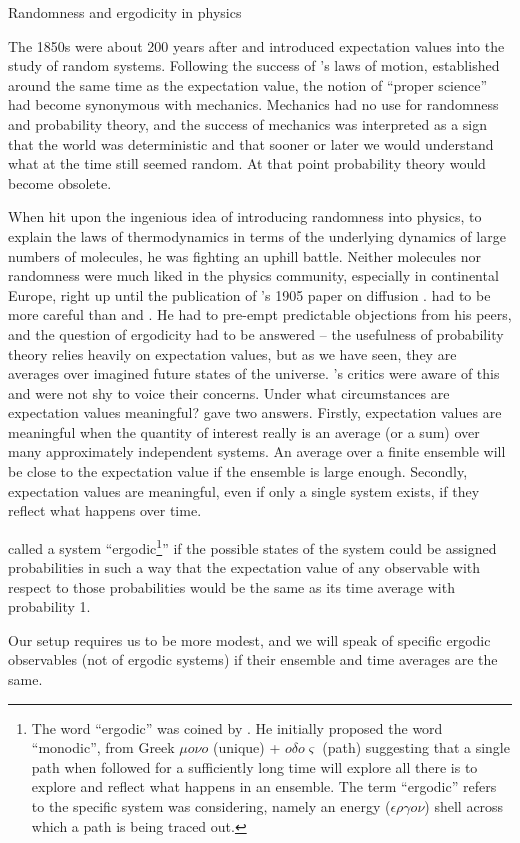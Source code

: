 \begin{history}{Randomness and ergodicity in physics}

The 1850s were about 200 years after  and  introduced expectation 
values into the study of random systems. Following the success of 's 
laws of motion, established around the same time as the expectation value, 
the notion of ``proper science'' had become synonymous with 
mechanics. Mechanics had no use for randomness and probability 
theory, and the success of mechanics was interpreted as a sign that 
the world was deterministic and that sooner or later we would understand 
what at the time still seemed random. At that point probability theory would 
become obsolete. 

When  hit upon the ingenious idea of introducing randomness into 
physics, to explain the laws of thermodynamics in terms of the underlying 
dynamics of large numbers of molecules, he was fighting an uphill battle. 
Neither molecules nor randomness were much liked in the physics 
community, especially in continental Europe, right up until the publication of 
's 1905 paper on diffusion \cite{Einstein1905}.  had to be 
more careful than  and . He had to pre-empt
predictable objections from his peers, and the question of ergodicity had to be 
answered -- the usefulness of probability theory relies heavily on expectation 
values, but as we have seen, they are averages over imagined future states of the 
universe. 's critics were aware of this and were not shy to voice their
concerns. Under what circumstances are expectation values meaningful? 
 gave two answers. Firstly, expectation values are meaningful when 
the quantity of interest really is an average (or a sum) over many approximately 
independent systems. An average over a finite ensemble will be close to the 
expectation value if the ensemble is large enough. Secondly, expectation values 
are meaningful, even if only a single system exists, if they reflect what happens over time. 

 called a system ``ergodic\footnote{The word ``ergodic'' was coined by . 
He initially proposed the word ``monodic'', from Greek $\mu o \nu o$ (unique) + $o\delta o \varsigma$ (path) suggesting 
that a single path when followed for a sufficiently long time will explore all there is to explore and reflect what happens 
in an ensemble. The term ``ergodic'' refers to the specific system  was considering, namely an energy 
($\epsilon \rho \gamma o \nu$) shell across which a path is being traced out.}'' if the possible 
states of the system could be assigned probabilities in such a way that
the expectation value of any observable with respect to those probabilities would 
be the same as its time average with probability 1.

Our setup requires us to be more modest, and we will speak of specific ergodic observables (not of ergodic systems) if their ensemble and time averages are the same.
\end{history}

